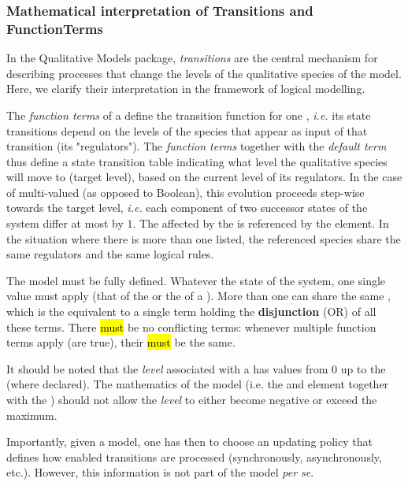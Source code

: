 \subsubsection{Mathematical interpretation of Transitions and FunctionTerms}
\label{math-interpret}

In the Qualitative Models  package, {\em transitions} are the central mechanism for describing processes that change the levels of the qualitative species of the model. Here, we clarify their interpretation in the framework of logical modelling.

The {\em function terms}  of a \Transition define the transition function for one \QualitativeSpecies, {\em i.e.} its state transitions depend on the levels of the species that appear as input of that transition (its "regulators"). The {\em function terms} together with the {\em default term} thus define a state transition table indicating what level the qualitative species will move to (target level), based on the current level of its regulators. In the case of multi-valued (as opposed to Boolean), this evolution proceeds step-wise towards the target level, {\em i.e.} each component of two successor states of the system differ at most by $1$. The \QualitativeSpecies affected by the \Transition is referenced by the \Output element. In the situation where there is more than one \Output listed, the referenced species share the same regulators and the same logical rules.

The model must be fully defined. Whatever the state of the system, one single value must apply (that of the \DefaultTerm or the  of a \FunctionTerm). More than one \FunctionTerm can share the same , which is the equivalent to a single term holding the {\bf disjunction} (OR) of all these terms.  There \hl{must} be no conflicting terms:  whenever multiple function terms apply (are true), their  \hl{must} be the same. 

It should be noted that the \emph{level} associated with a \QualitativeSpecies has values from 0 up to the  (where declared). The mathematics of the model (i.e. the \FunctionTerm and \DefaultTerm element together with the ) should not allow the \emph{level} to either become negative or exceed the maximum.

Importantly, given a model, one has then to choose an updating policy that defines how enabled transitions are processed (synchronously, asynchronously, etc.). However, this information is not part of the model {\em per se}. 


